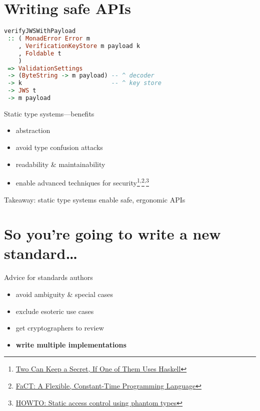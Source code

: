\documentclass[ignorenonframetext,aspectratio=43]{beamer}
\providecommand{\tightlist}{%
  \setlength{\itemsep}{0pt}\setlength{\parskip}{0pt}}
\begin{document}
\section{Writing safe APIs}

\begin{frame}[fragile]
\begin{lstlisting}[language=Haskell]
verifyJWSWithPayload
 :: ( MonadError Error m
    , VerificationKeyStore m payload k
    , Foldable t
    )
 => ValidationSettings
 -> (ByteString -> m payload) -- ^ decoder
 -> k                         -- ^ key store
 -> JWS t
 -> m payload
\end{lstlisting}
\end{frame}

\begin{frame}{Static type systems---benefits}
\begin{itemize}
\tightlist
\item abstraction
\item avoid type confusion attacks
\item readability \& maintainability
\item enable advanced techniques for security\footnote[frame]{
    \href{http://www.cse.chalmers.se/~russo/publications_files/pearl-russo.pdf}{
        Two Can Keep a Secret, If One of Them Uses Haskell}}\textsuperscript{,}\footnote[frame]{
    \href{https://cseweb.ucsd.edu/~dstefan/pubs/cauligi:2017:fact.pdf}{
        FaCT: A Flexible, Constant-Time Programming Language}}\textsuperscript{,}\footnote[frame]{
    \href{https://blog.janestreet.com/howto-static-access-control-using-phantom-types/}{
        HOWTO: Static access control using phantom types}}

\end{itemize}
\end{frame}

\begin{frame}[plain]
\LARGE
Takeaway: static type systems enable safe, ergonomic APIs
\end{frame}





\section{So you're going to write a new standard\ldots}

\begin{frame}{Advice for standards authors}
\begin{itemize}
\tightlist
\item avoid ambiguity \& special cases
\item exclude esoteric use cases
\item get cryptographers to review
\item {\bf write multiple implementations}
\end{itemize}
\end{frame}
\end{document}
